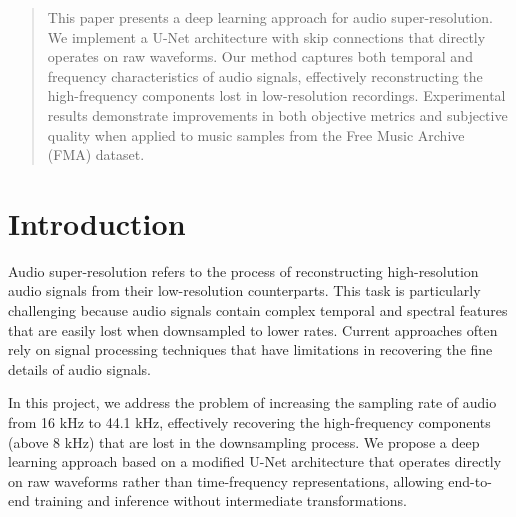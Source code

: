 \documentclass{article}
\begin{document}

\printAffiliationsAndNotice

\begin{abstract}
This paper presents a deep learning approach for audio super-resolution.
We implement a U-Net architecture with skip connections that directly operates on raw waveforms.
Our method captures both temporal and frequency characteristics of audio signals, effectively reconstructing the high-frequency components lost in low-resolution recordings.
Experimental results demonstrate improvements in both objective metrics and subjective quality when applied to music samples from the Free Music Archive (FMA) dataset.
\end{abstract}

\section{Introduction}

Audio super-resolution refers to the process of reconstructing high-resolution audio signals from their low-resolution counterparts. 
This task is particularly challenging because audio signals contain complex temporal and spectral features that are easily lost when downsampled to lower rates.
Current approaches often rely on signal processing techniques that have limitations in recovering the fine details of audio signals.

In this project, we address the problem of increasing the sampling rate of audio from 16 kHz to 44.1 kHz, effectively recovering the high-frequency components (above 8 kHz) that are lost in the downsampling process.
We propose a deep learning approach based on a modified U-Net architecture that operates directly on raw waveforms rather than time-frequency representations, allowing end-to-end training and inference without intermediate transformations.
\end{document}
